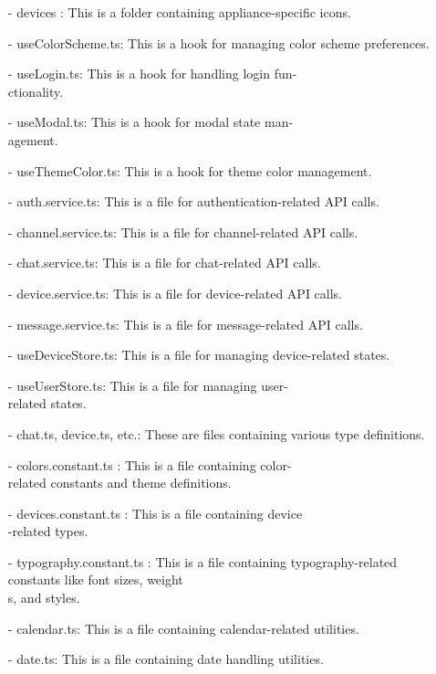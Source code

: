 \documentclass[conference]{IEEEtran}
\begin{document}
\begin{enumerate}
        \item[-] devices : This is a folder containing appliance-specific icons.\\
        \item[-] useColorScheme.ts: This is a hook for managing color scheme preferences. \\
        \item[-] useLogin.ts: This is a hook for handling login fun-\\ctionality. \\
        \item[-] useModal.ts: This is a hook for modal state man-\\agement. \\
        \item[-] useThemeColor.ts: This is a hook for theme color management.\\
        \item[-] auth.service.ts: This is a file for authentication-related API calls. \\
        \item[-] channel.service.ts: This is a file for channel-related API calls. \\
        \item[-] chat.service.ts: This is a file for chat-related API calls. \\
        \item[-] device.service.ts: This is a file for device-related API calls. \\
        \item[-] message.service.ts: This is a file for message-related API calls. \\
        \item[-] useDeviceStore.ts: This is a file for managing device-related states. \\
        \item[-] useUserStore.ts: This is a file for managing user-\\related states. \\
        \item[-] chat.ts, device.ts, etc.: These are files containing various type definitions. \\
        \item[-] colors.constant.ts : This is a file containing color-\\related constants and theme definitions.\\
        \item[-] devices.constant.ts : This is a file containing device\\-related types.\\
        \item[-] typography.constant.ts : This is a file containing typography-related constants like font sizes, weight\\s, and styles.\\
        \item[-] calendar.ts: This is a file containing calendar-related utilities. \\
        \item[-] date.ts: This is a file containing date handling utilities.\\
        

\end{enumerate}
\end{document}
